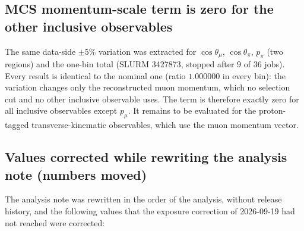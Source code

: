 \subsection{MCS momentum-scale term is zero for the other inclusive observables}
The same data-side $\pm5\%$ variation was extracted for $\cos\theta_\mu$, $\cos\theta_\pi$,
$p_\pi$ (two regions) and the one-bin total (SLURM 3427873, stopped after 9 of 36 jobs). Every result
is identical to the nominal one (ratio $1.000000$ in every bin): the variation changes only the
reconstructed muon momentum, which no selection cut and no other inclusive observable uses. The term
is therefore exactly zero for all inclusive observables except $p_\mu$. It remains to be evaluated
for the proton-tagged transverse-kinematic observables, which use the muon momentum vector.

\subsection{Values corrected while rewriting the analysis note (numbers moved)}
The analysis note was rewritten in the order of the analysis, without release history, and the
following values that the exposure correction of 2026-09-19 had not reached were corrected:

